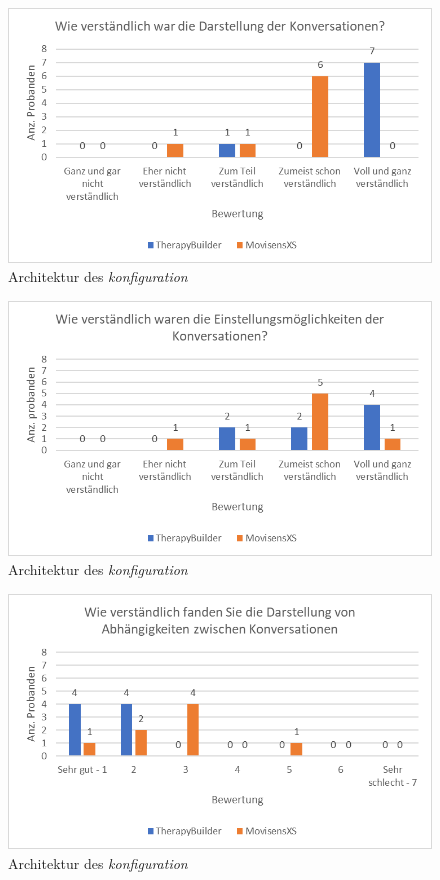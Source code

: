 \begin{figure}[h]
\centering
\includegraphics[width=1\textwidth]{pictures/diagramme/konversationdarstellung}
\caption{Architektur des \emph{konfiguration}}
\label{therapyBuilder}
\end{figure}

\begin{figure}[h]
\centering
\includegraphics[width=1\textwidth]{pictures/diagramme/konversationeinstellung}
\caption{Architektur des \emph{konfiguration}}
\label{therapyBuilder}
\end{figure}

\begin{figure}[h]
\centering
\includegraphics[width=1\textwidth]{pictures/diagramme/konversationenabhaeng}
\caption{Architektur des \emph{konfiguration}}
\label{therapyBuilder}
\end{figure}


